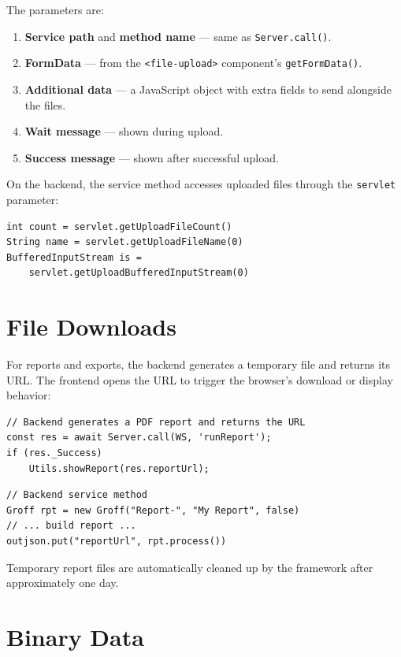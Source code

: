 \noindent
The parameters are:

\begin{enumerate}
  \item \textbf{Service path} and \textbf{method name} --- same as \texttt{Server.call()}.
  \item \textbf{FormData} --- from the \texttt{<file-upload>} component's \texttt{getFormData()}.
  \item \textbf{Additional data} --- a JavaScript object with extra fields to send alongside the files.
  \item \textbf{Wait message} --- shown during upload.
  \item \textbf{Success message} --- shown after successful upload.
\end{enumerate}

\noindent
On the backend, the service method accesses uploaded files through the \texttt{servlet} parameter:

\begin{lstlisting}[style=groovy]
int count = servlet.getUploadFileCount()
String name = servlet.getUploadFileName(0)
BufferedInputStream is =
    servlet.getUploadBufferedInputStream(0)
\end{lstlisting}

\section{File Downloads}
\label{sec:sc-downloads}

For reports and exports, the backend generates a temporary file and returns its URL.  The frontend opens the URL to trigger the browser's download or display behavior:

\begin{lstlisting}[style=javascript]
// Backend generates a PDF report and returns the URL
const res = await Server.call(WS, 'runReport');
if (res._Success)
    Utils.showReport(res.reportUrl);
\end{lstlisting}

\begin{lstlisting}[style=groovy]
// Backend service method
Groff rpt = new Groff("Report-", "My Report", false)
// ... build report ...
outjson.put("reportUrl", rpt.process())
\end{lstlisting}

\noindent
Temporary report files are automatically cleaned up by the framework after approximately one day.

\section{Binary Data}
\label{sec:sc-binary}

